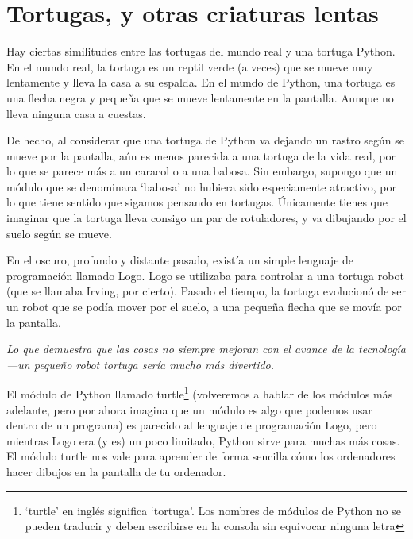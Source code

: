 

\chapter{Tortugas, y otras criaturas lentas}\label{ch:turtles}

Hay ciertas similitudes entre las tortugas del mundo real y una tortuga Python. En el mundo real, la tortuga es un reptil verde (a veces) que se mueve muy lentamente y lleva la casa a su espalda.  En el mundo de Python, una tortuga es una flecha negra y pequeña que se mueve lentamente en la pantalla. Aunque no lleva ninguna casa a cuestas.

De hecho, al considerar que una tortuga de Python va dejando un rastro según se mueve por la pantalla, aún es menos parecida a una tortuga de la vida real, por lo que se parece más a un caracol o a una babosa. Sin embargo, supongo que un módulo que se denominara `babosa' no hubiera sido especiamente atractivo, por lo que tiene sentido que sigamos pensando en tortugas. Únicamente tienes que imaginar que la tortuga lleva consigo un par de rotuladores, y va dibujando por el suelo según se mueve.

En el oscuro, profundo y distante pasado, existía un simple lenguaje de programación llamado Logo. Logo se utilizaba para controlar a una tortuga robot (que se llamaba Irving, por cierto). Pasado el tiempo, la tortuga evolucionó de ser un robot que se podía mover por el suelo, a una pequeña flecha que se movía por la pantalla.

\emph{Lo que demuestra que las cosas no siempre mejoran con el avance de la tecnología---un pequeño robot tortuga sería mucho más divertido.}

El módulo de Python llamado turtle\footnote{`turtle' en inglés significa `tortuga'. Los nombres de módulos de Python no se pueden traducir y deben escribirse en la consola sin equivocar ninguna letra} (volveremos a hablar de los módulos más adelante, pero por ahora imagina que un módulo es algo que podemos usar dentro de un programa) es parecido al lenguaje de programación Logo, pero mientras Logo era (y es) un poco limitado, Python sirve para muchas más cosas.  El módulo turtle nos vale para aprender de forma sencilla cómo los ordenadores hacer dibujos en la pantalla de tu ordenador.


